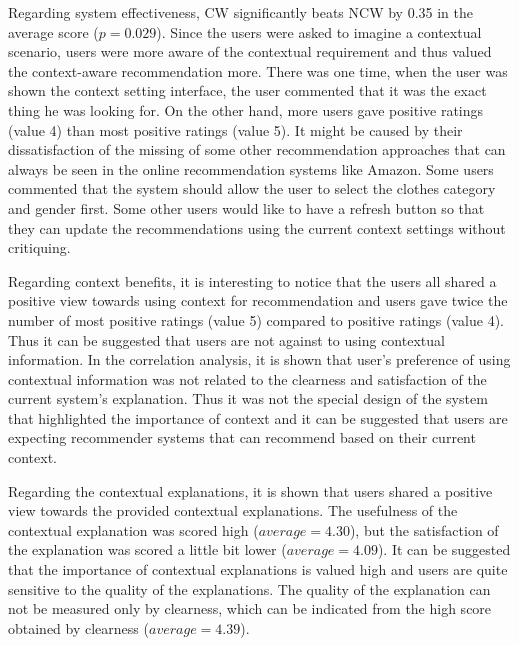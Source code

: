 Regarding system effectiveness, CW significantly beats NCW by 0.35 in the average score ($p=0.029$). Since the users were asked to imagine a contextual scenario, users were more aware of the contextual requirement and thus valued the context-aware recommendation more. There was one time, when the user was shown the context setting interface, the user commented that it was the exact thing he was looking for. On the other hand, more users gave positive ratings (value 4) than most positive ratings (value 5). It might be caused by their dissatisfaction of the missing of some other recommendation approaches that can always be seen in the online recommendation systems like Amazon. Some users commented that the system should allow the user to select the clothes category and gender first. Some other users would like to have a refresh button so that they can update the recommendations using the current context settings without critiquing.

Regarding context benefits, it is interesting to notice that the users all shared a positive view towards using context for recommendation and users gave twice the number of most positive ratings (value 5) compared to positive ratings (value 4). Thus it can be suggested that users are not against to using contextual information. In the correlation analysis, it is shown that user's preference of using contextual information was not related to the clearness and satisfaction of the current system's explanation. Thus it was not the special design of the system that highlighted the importance of context and it can be suggested that users are expecting recommender systems that can recommend based on their current context. 

Regarding the contextual explanations, it is shown that users shared a positive view towards the provided contextual explanations. The usefulness of the contextual explanation was scored high ($average = 4.30$), but the satisfaction of the explanation was scored a little bit lower ($average = 4.09$). It can be suggested that the importance of contextual explanations is valued high and users are quite sensitive to the quality of the explanations. The quality of the explanation can not be measured only by clearness, which can be indicated from the high score obtained by clearness ($average = 4.39$). 

